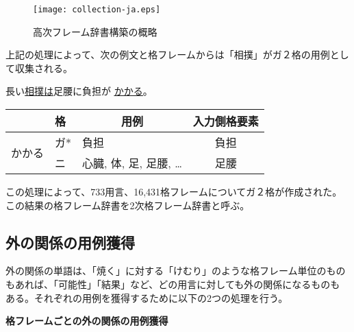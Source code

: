 \documentclass[fleqn]{nlp}
\begin{document}
\begin{figure}[t]
 \begin{center}
  \texttt{[image: collection-ja.eps]}
  \caption{高次フレーム辞書構築の概略}
  \label{図::高次フレーム辞書構築の概略}

  \vspace*{2ex}

 \end{center}
\end{figure}

上記の処理によって、次の例文と格フレームからは「相撲」がガ２格の用例とし
て収集される。
\begin{exe}
 \ex 長い\underline{相撲は}足腰に負担が \underline{\underline{かかる}}。
\end{exe}
\begin{center}
 \begin{tabular}{l|l|l||c} \hline
                           & 格  & \multicolumn{1}{c||}{用例} & 入力側格要素 \\ \hline
 \multirow{2}{3zw}{かかる} & ガ* & 負担 & 負担 \\
                           & ニ  & 心臓, 体, 足, 足腰, … & 足腰 \\ \hline
 \end{tabular}
\end{center}

\vspace*{2ex}

この処理によって、733用言、16,431格フレームについてガ２格が作成された。
この結果の格フレーム辞書を2次格フレーム辞書と呼ぶ。


\subsection{外の関係の用例獲得}

外の関係の単語は、「焼く」に対する「けむり」のような格フレーム単位のもの
もあれば、「可能性」「結果」など、どの用言に対しても外の関係になるものも
ある。それぞれの用例を獲得するために以下の2つの処理を行う。

\vspace*{1.5ex}

\noindent
\textbf{格フレームごとの外の関係の用例獲得}
\end{document}
